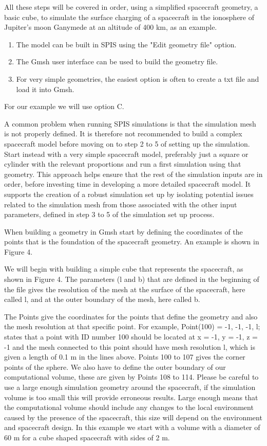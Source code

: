 \documentclass[a4paper, 11pt]{article}
\begin{document}
All these steps will be covered in order, using a simplified spacecraft geometry, a basic cube, to simulate the surface charging of a spacecraft in the ionosphere of Jupiter's moon Ganymede at an altitude of 400 km, as an example.
\begin{enumerate}[label=\Alph*.]
    \item The model can be built in SPIS using the "Edit geometry file" option.
    \item The Gmsh user interface can be used to build the geometry file.
    \item For very simple geometries, the easiest option is often to create a txt file and load it into Gmsh.
\end{enumerate}
For our example we will use option C.\par
A common problem when running SPIS simulations is that the simulation mesh is not properly defined. It is therefore not recommended to build a complex spacecraft model before moving on to step 2 to 5 of setting up the simulation. Start instead with a very simple spacecraft model, preferably just a square or cylinder with the relevant proportions and run a first simulation using that geometry. This approach helps ensure that the rest of the simulation inputs are in order, before investing time in developing a more detailed spacecraft model. It supports the creation of a robust  simulation set up by isolating potential issues related to the simulation mesh from those associated with the other input parameters, defined in step 3 to 5 of the simulation set up process.\par
When building a geometry in Gmsh start by defining the coordinates of the points that is the foundation of the spacecraft geometry. An example is shown in Figure 4.\par
We will begin with building a simple cube that represents the spacecraft, as shown in Figure 4. The parameters (l and b) that are defined in the beginning of the file gives the resolution of the mesh at the surface of the spacecraft, here called l, and at the outer boundary of the mesh, here called b.\par
The Points give the coordinates for the points that define the geometry and also the mesh resolution at that specific point. For example, Point(100) = {-1, -1, -1, l}; states that a point with ID number 100 should be located at x = -1, y = -1, z = -1 and the mesh connected to this point should have mesh resolution l, which is given a length of 0.1 m in the lines above. Points 100 to 107 gives the corner points of the sphere. We also have to define the outer boundary of our computational volume, these are given by Points 108 to 114. Please be careful to use a large enough simulation geometry around the spacecraft, if the simulation volume is too small this will provide erroneous results. Large enough means that the computational volume should include any changes to the local environment caused by the presence of the spacecraft, this size will depend on the environment and spacecraft design. In this example we start with a volume with a diameter of 60 m for a cube shaped spacecraft with sides of 2 m.
\end{document}
